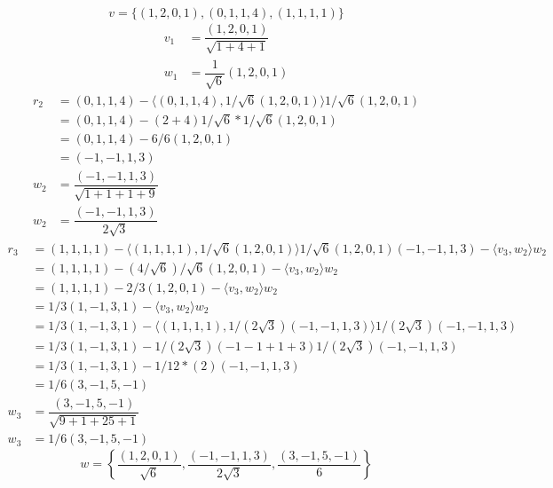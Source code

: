 \documentclass[12pt]{article}
\begin{document}
\section{}
\[ v = \{(1,2,0,1), (0,1,1,4), (1,1,1,1) \} \]
\begin{align*}
	v_1 &= \dfrac{(1,2,0,1)}{\sqrt{1+4+1}}\\
	w_1 &= \dfrac{1}{\sqrt{6}} (1,2,0,1)
\end{align*}
\begin{align*}
	r_2 &= (0,1,1,4) - \langle (0,1,1,4), 1/\sqrt{6}(1,2,0,1)\rangle 1/\sqrt{6} (1,2,0,1)\\
	&= (0,1,1,4) - (2+4)1/\sqrt{6} * 1/\sqrt{6} (1,2,0,1)\\
	&= (0,1,1,4) - 6/6 (1,2,0,1)\\
	&= (-1,-1,1,3)\\
	w_2 &= \dfrac{(-1,-1,1,3)}{\sqrt{1+1+1+9}}\\
	w_2 &= \dfrac{(-1,-1,1,3)}{2\sqrt{3}}
\end{align*}
\begin{align*}
	r_3 &= (1,1,1,1) - \langle (1,1,1,1), 1/\sqrt{6}(1,2,0,1) \rangle 1/\sqrt{6} (1,2,0,1)  (-1,-1,1,3) -\langle v_3, w_2 \rangle w_2 \\
	&= (1,1,1,1) - (4/\sqrt{6})/\sqrt{6} (1,2,0,1) -\langle v_3, w_2 \rangle w_2\\
	&= (1,1,1,1) - 2/3(1,2,0,1) - \langle v_3, w_2 \rangle w_2\\
	&= 1/3 (1, -1, 3, 1) - \langle v_3, w_2 \rangle w_2\\
	&= 1/3 (1, -1, 3, 1) - \langle (1,1,1,1), 1/(2\sqrt{3}) (-1, -1, 1,3) \rangle 1/(2\sqrt{3})(-1,-1,1,3)\\
	&= 1/3 (1, -1, 3, 1) - 1/(2\sqrt{3}) (-1-1+ 1+3) 1/(2\sqrt{3})(-1,-1,1,3)\\
	&= 1/3 (1, -1, 3, 1) - 1/12 * (2) (-1,-1,1,3)\\
	&= 1/6 (3, -1, 5, -1)\\
	w_3 &= \dfrac{(3, -1, 5, -1)}{\sqrt{9+1+25+1}}\\
	w_3 &= 1/6 (3, -1, 5, -1)
\end{align*}
\[ w = \left\{\dfrac{(1,2,0,1)}{\sqrt{6}},\dfrac{(-1,-1,1,3)}{2\sqrt{3}},\dfrac{(3, -1, 5, -1)}{6} \right\} \]
\end{document}
